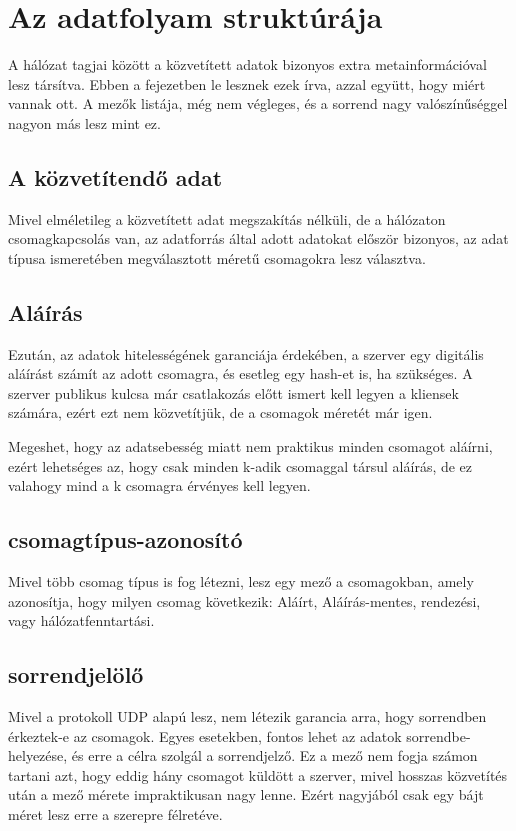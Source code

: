 \chapter{Az adatfolyam strukt\'ur\'aja}

A hálózat tagjai között a közvetített adatok bizonyos extra
metainformációval lesz társítva. Ebben a fejezetben le lesznek ezek írva,
azzal együtt, hogy miért vannak ott. A mezők listája, még nem végleges,
és a sorrend nagy valószínűséggel nagyon más lesz mint ez.

\section{A közvetítendő adat}

Mivel elméletileg a közvetített adat megszakítás nélküli, de a hálózaton
csomagkapcsolás van, az adatforrás által adott adatokat először bizonyos,
az adat típusa ismeretében megválasztott méretű csomagokra lesz választva.

\section{Aláírás}

Ezután, az adatok hitelességének garanciája érdekében, a szerver egy
digitális aláírást számít az adott csomagra, és esetleg egy hash-et is,
ha szükséges. A szerver publikus kulcsa már csatlakozás előtt ismert kell
legyen a kliensek számára, ezért ezt nem közvetítjük, de a csomagok
méretét már igen.

Megeshet, hogy az adatsebesség miatt nem praktikus minden csomagot
aláírni, ezért lehetséges az, hogy csak minden k-adik csomaggal társul
aláírás, de ez valahogy mind a k csomagra érvényes kell legyen.

\section{csomagtípus-azonosító}

Mivel több csomag típus is fog létezni, lesz egy mező a csomagokban,
amely azonosítja, hogy milyen csomag következik: Aláírt, Aláírás-mentes,
rendezési, vagy hálózatfenntartási.

\section{sorrendjelölő}

Mivel a protokoll UDP alapú lesz, nem létezik garancia arra, hogy
sorrendben érkeztek-e az csomagok. Egyes esetekben, fontos lehet az
adatok sorrendbe-helyezése, és erre a célra szolgál a sorrendjelző. 
Ez a mező nem fogja számon tartani azt, hogy eddig hány csomagot küldött
a szerver, mivel hosszas közvetítés után a mező mérete impraktikusan nagy
lenne. Ezért nagyjából csak egy bájt méret lesz erre a szerepre
félretéve.
